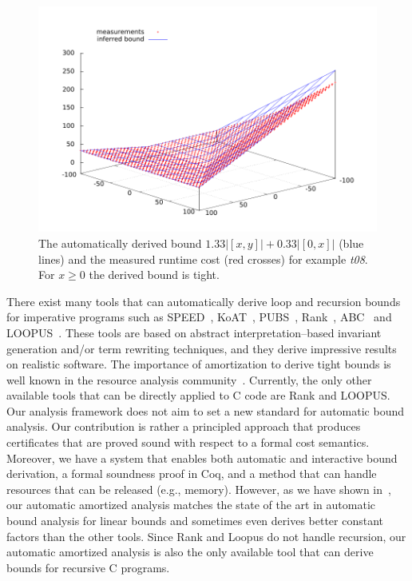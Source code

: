 \documentclass[nocopyrightspace,preprint,pldi]{sigplanconf-pldi15}
\newcommand{\pref}[1]{\prettyref{#1}}
\begin{document}
\begin{figure}[t]
\center
\includegraphics[width=.9\linewidth]{fig/bound3d}
\caption{The automatically derived bound $1.33|[x,y]| + 0.33 |[0,x]|$
  (blue lines) and the measured runtime cost (red crosses) for example
  \emph{t08}. For $x\ge 0$ the derived bound is tight.}
\label{fig:3d}
\end{figure}

There exist many tools that can automatically derive loop and
recursion bounds for imperative programs such as
SPEED~\cite{GulwaniMC09,GulwaniZ10}, KoAT~\cite{BrockschmidtEFFG14},
PUBS~\cite{AlbertAGPZ12}, Rank~\cite{AliasDFG10},
ABC~\cite{BlancHHK10} and LOOPUS~\cite{Zuleger11,SinnZV14}.  These
tools are based on abstract interpretation--based invariant generation
and/or term rewriting techniques, and they derive impressive results
on realistic software.  The importance of amortization to derive tight
bounds is well known in the resource analysis
community~\cite{AlonsoG12,Moser14,SinnZV14}.  Currently, the only
other available tools that can be directly applied to C code are Rank
and LOOPUS.  Our analysis framework does not aim to set a new standard
for automatic bound analysis.  Our contribution is rather a principled
approach that produces certificates that are proved sound with respect
to a formal cost semantics.  Moreover, we have a system that enables
both automatic and interactive bound derivation, a formal soundness
proof in Coq, and a method that can handle resources that can be
released (e.g., memory).  However, as we have shown
in~\pref{sec:exper}, our automatic amortized analysis matches the
state of the art in automatic bound analysis for linear bounds and
sometimes even derives better constant factors than the other tools.
Since Rank and Loopus do not handle recursion, our automatic amortized
analysis is also the only available tool that can derive bounds for
recursive C programs.
\end{document}
